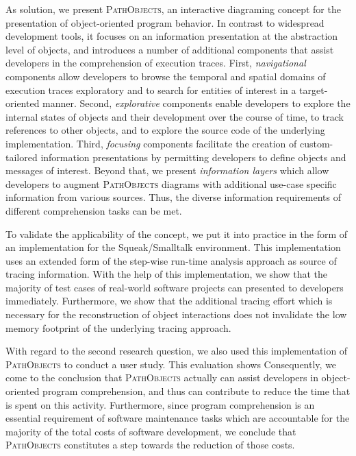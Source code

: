 As solution, we present \textsc{PathObjects}, an interactive diagraming concept for the presentation of object-oriented program behavior.
In contrast to widespread development tools, it focuses on an information presentation at the abstraction level of objects, and introduces a number of additional components that assist developers in the comprehension of execution traces.
First, \textit{navigational} components allow developers to browse the temporal and spatial domains of execution traces exploratory and to search for entities of interest in a target-oriented manner.
Second, \textit{explorative} components enable developers to explore the internal states of objects and their development over the course of time, to track references to other objects, and to explore the source code of the underlying implementation.
Third, \textit{focusing} components facilitate the creation of custom-tailored information presentations by permitting developers to define objects and messages of interest.
Beyond that, we present \textit{information layers} which allow developers to augment \textsc{PathObjects} diagrams with additional use-case specific information from various sources.
Thus, the diverse information requirements of different comprehension tasks can be met.

To validate the applicability of the concept, we put it into practice in the form of an implementation for the Squeak/Smalltalk environment.
This implementation uses an extended form of the step-wise run-time analysis approach as source of tracing information.
With the help of this implementation, we show that the majority of test cases of real-world software projects can presented to developers immediately.
Furthermore, we show that the additional tracing effort which is necessary for the reconstruction of object interactions does not invalidate the low memory footprint of the underlying tracing approach.

With regard to the second research question, we also used this implementation of \textsc{PathObjects} to conduct a user study.
This evaluation shows 
Consequently, we come to the conclusion that \textsc{PathObjects} actually can assist developers in object-oriented program comprehension, and thus can contribute to reduce the time that is spent on this activity.
Furthermore, since program comprehension is an essential requirement of software maintenance tasks which are accountable for the majority of the total costs of software development, we conclude that \textsc{PathObjects} constitutes a step towards the reduction of those costs.

